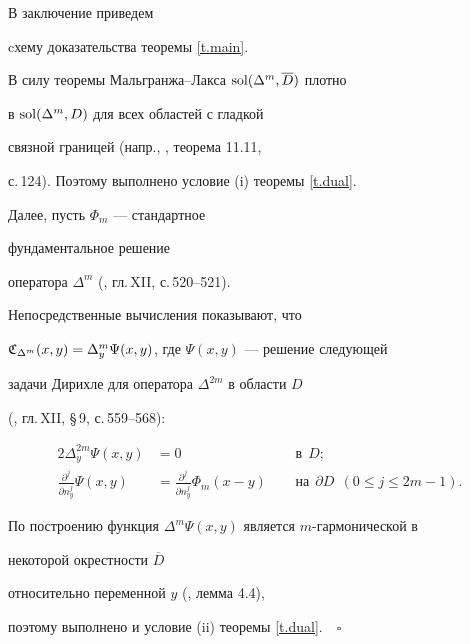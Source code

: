 В заключение приведем


cхему доказательства теоремы \ref{t.main}.


В силу теоремы Мальгранжа--Лакса $\operatorname{sol} (\Delta ^m , \overline D)$ плотно


в $\operatorname{sol}(\Delta ^m, D)$ для всех областей с гладкой


связной границей (напр., \cite{Ta2}, теорема 11.11,


с.\,124). Поэтому выполнено условие (i) теоремы \ref{t.dual}.


Далее, пусть $\Phi _m$ --- стандартное


фундаментальное решение


оператора $\Delta ^m$ (\cite{So}, гл.\,XII, с.\,520--521).


Непосредственные вычисления показывают, что


${\frak C}_{\Delta ^m}(x,y) = \Delta ^m _y


\Psi (x,y)$, где $\Psi (x,y)$ --- решение следующей


задачи Дирихле для оператора $\Delta ^{2m}$ в области $D$


(\cite{So}, гл.\,XII, \S\,9, с.\,559--568):


\begin{alignat*}{2}




\Delta ^{2m} _y \Psi (x,y) &= 0 &\ \ &\text{в} \ \ D; \\


\frac{\partial^j }{\partial n^j_y}


\Psi (x,y) &=


\frac{\partial^j }{\partial n^j_y}


 \Phi _m (x-y) &\ \  &\text{на} \ \ \partial D \ \


(0\leq j \leq 2m-1). 


\end{alignat*}


По построению функция $\Delta ^m \Psi (x,y)$ является $m$-гармонической в


некоторой окрестности $\overline D$


относительно переменной $y$ (\cite{NaciShla1Tarkh1}, лемма 4.4),


поэтому выполнено и условие (ii) теоремы \ref{t.dual}.$\quad\square$








